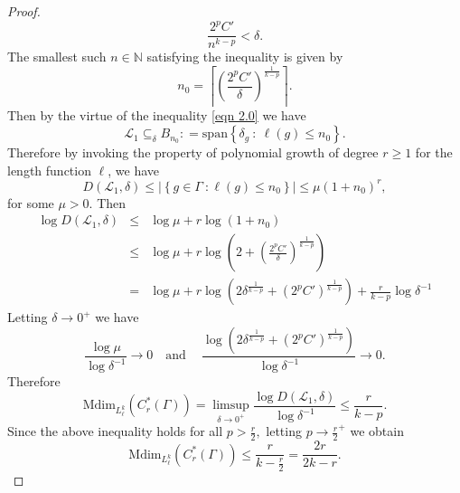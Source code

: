 \documentclass[a4paper,11pt,reqno]{amsart}
\theoremstyle{plain}
\theoremstyle{mainthmstyle}
\theoremstyle{named}
\numberwithin{equation}{section}
\newcommand{\Bea}{\begin{eqnarray*}}
\newcommand{\Eea}{\end{eqnarray*}}
\begin{document}
\begin{proof}
$$\frac {2^{p} C'} {n^{k - p}} < \delta.$$ The smallest such $n \in \mathbb N$ satisfying the inequality is given by $$n_{0} = \left \lceil \left (\frac {2^{p} C'} {\delta} \right )^{\frac {1} {k - p}} \right \rceil.$$ Then by the virtue of the inequality \eqref{eqn 2.0} we have $$\mathcal L_{1} \subseteq_{\delta} B_{n_{0}} : = \mathrm {span} \left \{\delta_{g}\ :\ \ell (g) \leq n_{0} \right \}.$$ Therefore by invoking the property of polynomial growth of degree $r \geq 1$ for the length function $\ell$, we have 
$$D \left (\mathcal L_{1}, \delta \right ) \leq \left \lvert \left \{g \in \Gamma\ : \ell (g) \leq n_{0} \right \} \right \rvert \leq \mu \left (1 + n_{0} \right )^{r},$$ for some $\mu > 0.$
Then \Bea \log D \left (\mathcal L_{1}, \delta \right ) & \leq & \log \mu + r \log \left (1 + n_{0} \right ) \\ & \leq & \log \mu + r \log \left (2 + \left (\frac {2^{p} C'} {\delta} \right )^{\frac {1} {k - p}} \right ) \\ & = & \log \mu + r \log \left (2 \delta^{\frac {1} {k - p}} + \left (2^{p} C' \right )^{\frac {1} {k - p}} \right ) + \frac {r} {k - p} \log \delta^{-1} \Eea 
Letting $\delta \to 0^{+}$ we have $$\frac {\log \mu} {\log \delta^{-1}} \to 0 \quad \mathrm {and}\ \quad \frac {\log \left (2 \delta^{\frac {1} {k - p}} + \left (2^{p} C' \right )^{\frac {1} {k - p}} \right )} {\log \delta^{-1}} \to 0.$$ 
Therefore $$\mathrm {Mdim}_{L_{\ell}^{k}} \left (C_{r}^{\ast} (\Gamma) \right ) = \limsup\limits_{\delta \to 0^{+}} \frac {\log D \left (\mathcal L_{1}, \delta \right )} {\log \delta^{-1}} \leq \frac {r} {k - p}.$$ Since the above inequality holds for all $p > \frac {r} {2},$ letting $p \to {\frac {r} {2}}^{+}$ we obtain $$\mathrm {Mdim}_{L_{\ell}^{k}} \left (C_{r}^{\ast} (\Gamma) \right ) \leq \frac {r} {k - \frac {r} {2}} = \frac {2 r} {2 k - r}.$$   
\end{proof}
\end{document}
